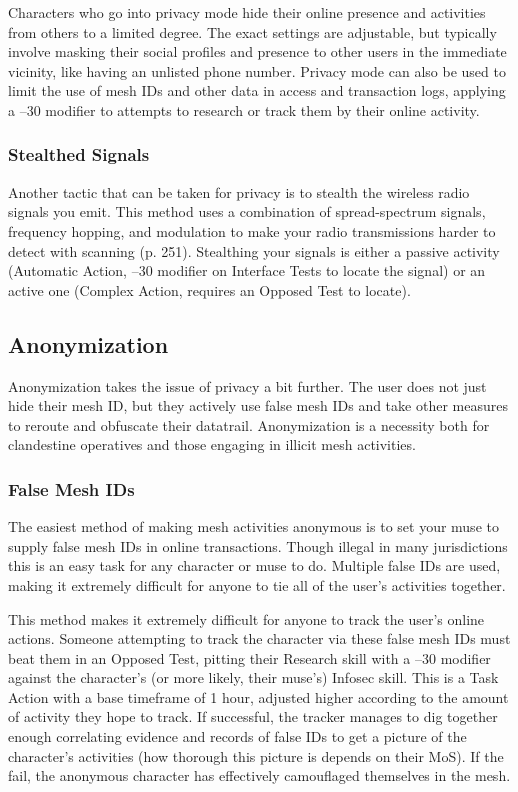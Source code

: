 Characters who go into privacy mode hide their online presence and activities from others to a limited degree. The exact settings are adjustable, but typically involve masking their social profiles and presence to other users in the immediate vicinity, like having an unlisted phone number. Privacy mode can also be used to limit the use of mesh IDs and other data in access and transaction logs, applying a –30 modifier to attempts to research or track them by their online activity. 

\subsubsection{Stealthed Signals} 

Another tactic that can be taken for privacy is to stealth the wireless radio signals you emit. This method uses a combination of spread-spectrum signals, frequency hopping, and modulation to make your radio transmissions harder to detect with scanning (p. 251). Stealthing your signals is either a passive activity (Automatic Action, –30 modifier on Interface Tests to locate the signal) or an active one (Complex Action, requires an Opposed Test to locate). 

\subsection{Anonymization} 

Anonymization takes the issue of privacy a bit further. The user does not just hide their mesh ID, but they actively use false mesh IDs and take other measures to reroute and obfuscate their datatrail. Anonymization is a necessity both for clandestine operatives and those engaging in illicit mesh activities. 

\subsubsection{False Mesh IDs} 

The easiest method of making mesh activities anonymous is to set your muse to supply false mesh IDs in online transactions. Though illegal in many jurisdictions this is an easy task for any character or muse to do. Multiple false IDs are used, making it extremely difficult for anyone to tie all of the user's activities together. 

This method makes it extremely difficult for anyone to track the user's online actions. Someone attempting to track the character via these false mesh IDs must beat them in an Opposed Test, pitting their Research skill with a –30 modifier against the character's (or more likely, their muse's) Infosec skill. This is a Task Action with a base timeframe of 1 hour, adjusted higher according to the amount of activity they hope to track. If successful, the tracker manages to dig together enough correlating evidence and records of false IDs to get a picture of the character's activities (how thorough this picture is depends on their MoS). If the fail, the anonymous character has effectively camouflaged themselves in the mesh. 

